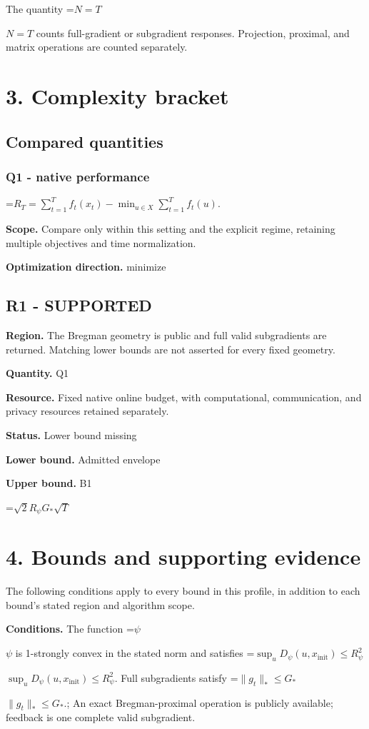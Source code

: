 \documentclass[10pt,a4paper]{article}
\newcommand{\AtlasMath}[1]{\par\begingroup\centering\setbox0=\hbox{$\displaystyle #1$}\ifdim\wd0>1.4\linewidth\typeout{ATLAS WIDE FORMULA: \the\wd0}\fi\ifdim\wd0>\linewidth\resizebox{\linewidth}{!}{\box0}\else\box0\fi\par\endgroup}
\newcommand{\AtlasInlineMath}[1]{\begingroup\setbox0=\hbox{$#1$}\ifdim\wd0>.4\linewidth\endgroup\AtlasMath{#1}\else\endgroup$#1$\fi}
\begin{document}
The quantity \AtlasInlineMath{N=T} counts full-gradient or subgradient responses. Projection, proximal, and matrix operations are counted separately.

\section{3. Complexity bracket}
\subsection{Compared quantities}
\subsubsection{Q1 - native performance}
\AtlasMath{R_T=\sum_{t=1}^{T}f_t(x_t)-\min_{u\in X}\sum_{t=1}^{T}f_t(u).}
\textbf{Scope.} Compare only within this setting and the explicit regime, retaining multiple objectives and time normalization.

\textbf{Optimization direction.} minimize

\subsection{R1 - SUPPORTED}
\textbf{Region.} The Bregman geometry is public and full valid subgradients are returned. Matching lower bounds are not asserted for every fixed geometry.

\textbf{Quantity.} Q1

\textbf{Resource.} Fixed native online budget, with computational, communication, and privacy resources retained separately.

\textbf{Status.} Lower bound missing

\textbf{Lower bound.} Admitted envelope

\textbf{Upper bound.} B1

\AtlasMath{\sqrt2R_\psi G_*\sqrt T}
\section{4. Bounds and supporting evidence}
The following conditions apply to every bound in this profile, in addition to each bound's stated region and algorithm scope.

\textbf{Conditions.} The function \AtlasInlineMath{\psi} is 1-strongly convex in the stated norm and satisfies \AtlasInlineMath{\sup_uD_\psi(u,x_{\mathrm{init}})\le R_\psi^2}. Full subgradients satisfy \AtlasInlineMath{\|g_t\|_*\le G_*}.; An exact Bregman-proximal operation is publicly available; feedback is one complete valid subgradient.
\end{document}
